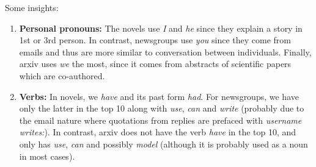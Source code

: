 Some insights: %
\begin{enumerate}
\item \textbf{Personal pronouns:} The novels use \emph{I} and \emph{he} since they explain a story in 1st or 3rd person. In contrast,
newsgroups use \emph{you} since they come from emails and thus are more similar to conversation between individuals.
Finally, arxiv uses \emph{we} the most, since it comes from abstracts of scientific papers which are co-authored.
\item \textbf{Verbs:} In novels, we \emph{have} and its past form \emph{had}. For newsgroups, we have only the latter in the top 10
along with \emph{use}, \emph{can} and \emph{write} (probably due to the email nature where quotations from replies are prefaced with \emph{username writes:}).
In contrast, arxiv does not have the verb \emph{have} in the top 10, and only has \emph{use}, \emph{can} and possibly
\emph{model} (although it is probably used as a noun in most cases).
\end{enumerate}

%
